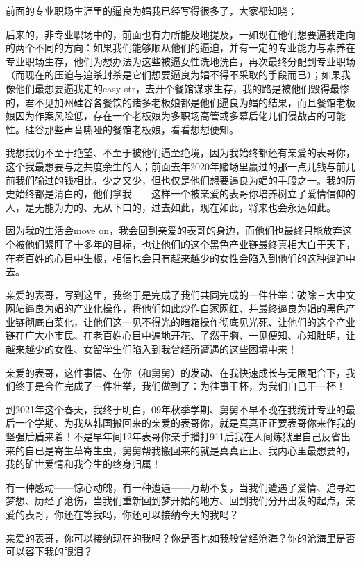 \documentclass[9pt, b5paper]{article}
\begin{document}
前面的专业职场生涯里的逼良为娼我已经写得很多了，大家都知晓；

后来的，非专业职场中的，前面也有力所能及地提及，一如现在他们想要逼我走向的两个不同的方向：如果我们能够顺从他们的逼迫，并有一定的专业能力与素养在专业职场生存，他们为想办法为这些被逼女性洗地洗白，再次最终分配到专业职场（而现在的压迫与追杀封杀是它们想要逼良为娼不得不采取的手段而已）；如果我像他们最想要逼我走的easy str，去开个餐馆谋求生存，我的路是被他们毁得最惨的，君不见加州硅谷各餐饮的诸多老板娘都是他们逼良为娼的结果，而且餐馆老板娘因为作案风险低，存在一个老板娘为多职场高管或多幕后佬儿们侵战占的可能性。硅谷那些声音嘶哑的餐馆老板娘，看看想想便知。

我想我仍不至于绝望、不至于被他们逼至绝境，因为我始终都还有亲爱的表哥你，这个我最想要与之共度余生的人；前面去年2020年赌场里赢过的那一点儿钱与前几前我们输过的钱相比，少之又少，但也仅是他们想要逼良为娼的手段之一。我的历史始终都是清白的，他们拿我——这样一个被亲爱的表哥你培养树立了爱情信仰的人，是无能为力的、无从下口的，过去如此，现在如此，将来也会永远如此。

因为我的生活会move on，我会回到亲爱的表哥的身边，而他们也最终只能放弃这个被他们紧盯了十多年的目标，也让他们的这个黑色产业链最终真相大白于天下，在老百姓的心目中生根，相信也会只有越来越少的女性会陷入到他们的这种逼迫中去。 

亲爱的表哥，写到这里，我终于是完成了我们共同完成的一件壮举：破除三大中文网站逼良为娼的产业化操作，将他们如此炒作自家网红、并最终逼良为娼的黑色产业链彻底白菜化，让他们这一见不得光的暗箱操作彻底见光死、让他们的这个产业链在广大小市民、在老百姓心目中遍地开花、了然于胸、一见便知、心知肚明，让越来越少的女性、女留学生们陷入到我曾经所遭遇的这些困境中来！

亲爱的表哥，这件事情、在你（和舅舅）的发动、在我快速成长与无限配合下，我们终于是合作完成了一件壮举，我们做到了：为往事干杯，为我们自己干一杯！

到2021年这个春天，我终于明白，09年秋季学期、舅舅不早不晚在我统计专业的最后一个学期、为我从韩国搬回来的亲爱的表哥你，就是真真正正要表哥你来作我的坚强后盾来着！不是早年间12年表哥你亲手播打911后我在人间炼狱里自己反省出来的自已是寄生草寄生虫，舅舅帮我搬回来的就是真真正正、我内心里最想要的，我的矿世爱情和我今生的终身归属！

有一种感动——惊心动魄，有一种遭遇——万劫不复，当我们遭遇了爱情、追寻过梦想、历经了沧伤，当我们重新回到梦开始的地方、回到我们分开出发的起点，亲爱的表哥，你还在等我吗，你还可以接纳今天的我吗？

亲爱的表哥，你可以接纳现在的我吗？你是否也如我般曾经沧海？你的沧海里是否可以容下我的眼泪？
\end{document}
